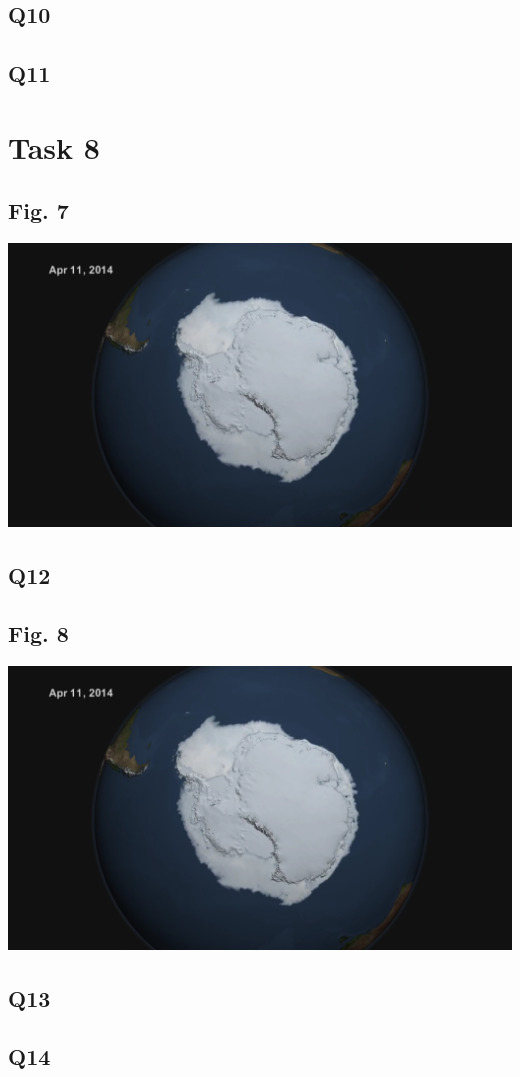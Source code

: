 \documentclass[11pt]{article}
\begin{document}
\subsection*{Q10}
\subsection*{Q11}

\section*{Task 8}
\subsection*{Fig. 7}
\includegraphics[width=\textwidth]{reportImages/figure7}

\subsection*{Q12}
\subsection*{Fig. 8}
\includegraphics[width=\textwidth]{reportImages/figure8}

\subsection*{Q13}
\subsection*{Q14}
\end{document}
